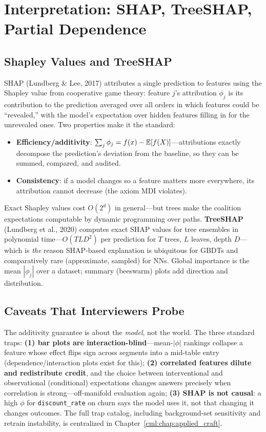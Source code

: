 \section{Interpretation: SHAP, TreeSHAP, Partial Dependence}
\label{cml:sec:interpretation}

\subsection{Shapley Values and TreeSHAP}

SHAP (Lundberg \& Lee, 2017) attributes a single prediction to features using the Shapley value from cooperative game theory: feature $j$'s attribution $\phi_j$ is its contribution to the prediction averaged over all orders in which features could be ``revealed,'' with the model's expectation over hidden features filling in for the unrevealed ones. Two properties make it the standard:
\begin{itemize}
    \item \textbf{Efficiency/additivity}: $\sum_j \phi_j = f(x) - \operatorname{\mathbb{E}}[f(X)]$---attributions exactly decompose the prediction's deviation from the baseline, so they can be summed, compared, and audited.
    \item \textbf{Consistency}: if a model changes so a feature matters more everywhere, its attribution cannot decrease (the axiom MDI violates).
\end{itemize}
Exact Shapley values cost $O(2^d)$ in general---but trees make the coalition expectations computable by dynamic programming over paths. \textbf{TreeSHAP} (Lundberg et al., 2020) computes exact SHAP values for tree ensembles in polynomial time---$O(T L D^2)$ per prediction for $T$ trees, $L$ leaves, depth $D$---which is \textit{the} reason SHAP-based explanation is ubiquitous for GBDTs and comparatively rare (approximate, sampled) for NNs. Global importance is the mean $|\phi_j|$ over a dataset; summary (beeswarm) plots add direction and distribution.

\subsection{Caveats That Interviewers Probe}

The additivity guarantee is about the \textit{model}, not the world. The three standard traps: \textbf{(1) bar plots are interaction-blind}---mean-$|\phi|$ rankings collapse a feature whose effect flips sign across segments into a mid-table entry (dependence/interaction plots exist for this); \textbf{(2) correlated features dilute and redistribute credit}, and the choice between interventional and observational (conditional) expectations changes answers precisely when correlation is strong---off-manifold evaluation again; \textbf{(3) SHAP is not causal}: a high $\phi$ for \texttt{discount\_rate} on churn says the model uses it, not that changing it changes outcomes. The full trap catalog, including background-set sensitivity and retrain instability, is centralized in Chapter~\ref{cml:chap:applied_craft}.

